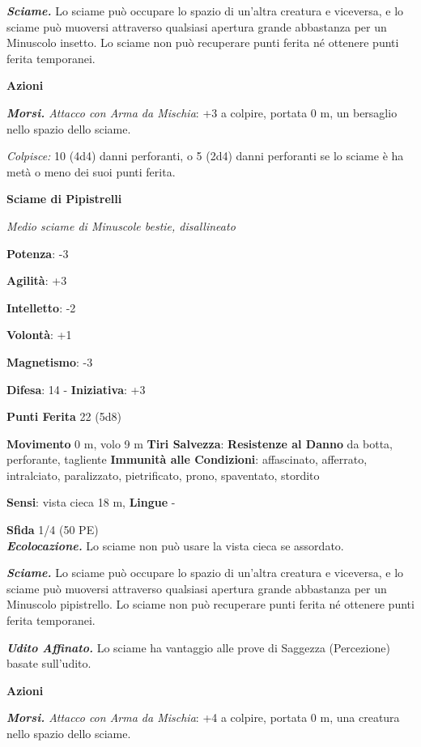 \begin{multicols}{2}
\emph{\textbf{Sciame.}} Lo sciame può occupare lo spazio di un'altra
creatura e viceversa, e lo sciame può muoversi attraverso qualsiasi
apertura grande abbastanza per un Minuscolo insetto. Lo sciame non può
recuperare punti ferita né ottenere punti ferita temporanei.

\smallskip\textbf{Azioni}

\emph{\textbf{Morsi.} Attacco con Arma da Mischia}: +3 a colpire,
portata 0 m, un bersaglio nello spazio dello sciame.

\emph{Colpisce:} 10 (4d4) danni perforanti, o 5 (2d4) danni perforanti
se lo sciame è ha metà o meno dei suoi punti ferita.

\textbf{Sciame di Pipistrelli}

\emph{Medio sciame di Minuscole bestie, disallineato}

\textbf{Potenza}: -3

\textbf{Agilità}: +3

\textbf{Intelletto}: -2

\textbf{Volontà}: +1

\textbf{Magnetismo}: -3

\textbf{Difesa}: 14 - \textbf{Iniziativa}: +3

\textbf{Punti Ferita} 22 (5d8)

\textbf{Movimento} 0 m, volo 9 m
\textbf{Tiri Salvezza}:
\textbf{Resistenze al Danno} da botta, perforante, tagliente
\textbf{Immunità alle Condizioni}: affascinato, afferrato, intralciato,
paralizzato, pietrificato, prono, spaventato, stordito

\textbf{Sensi}: vista cieca 18 m,  \textbf{Lingue} -

\textbf{Sfida} 1/4 (50 PE)\smallskip\\

\emph{\textbf{Ecolocazione.}} Lo sciame non può usare la vista cieca se
assordato.

\emph{\textbf{Sciame.}} Lo sciame può occupare lo spazio di un'altra
creatura e viceversa, e lo sciame può muoversi attraverso qualsiasi
apertura grande abbastanza per un Minuscolo pipistrello. Lo sciame non
può recuperare punti ferita né ottenere punti ferita temporanei.

\emph{\textbf{Udito Affinato.}} Lo sciame ha vantaggio alle prove di
Saggezza (Percezione) basate sull'udito.

\smallskip\textbf{Azioni}

\emph{\textbf{Morsi.} Attacco con Arma da Mischia}: +4 a colpire,
portata 0 m, una creatura nello spazio dello sciame.


\end{multicols}
